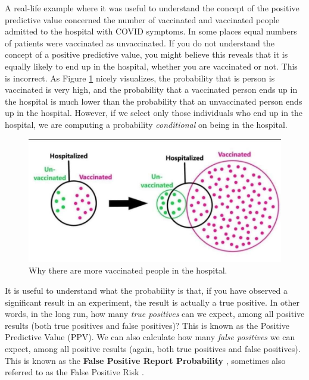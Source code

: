 \documentclass[
  oneside]{book}
\begin{document}
A real-life example where it was useful to understand the concept of the positive predictive value concerned the number of vaccinated and vaccinated people admitted to the hospital with COVID symptoms. In some places equal numbers of patients were vaccinated as unvaccinated. If you do not understand the concept of a positive predictive value, you might believe this reveals that it is equally likely to end up in the hospital, whether you are vaccinated or not. This is incorrect. As Figure \ref{fig:ppvhospital} nicely visualizes, the probability that is person is vaccinated is very high, and the probability that a vaccinated person ends up in the hospital is much lower than the probability that an unvaccinated person ends up in the hospital. However, if we select only those individuals who end up in the hospital, we are computing a probability \emph{conditional} on being in the hospital.

\begin{figure}

{\centering \includegraphics[width=1\linewidth]{images/hospitalvaccinated} 

}

\caption{Why there are more vaccinated people in the hospital.}\label{fig:ppvhospital}
\end{figure}

It is useful to understand what the probability is that, if you have observed a significant result in an experiment, the result is actually a true positive. In other words, in the long run, how many \emph{true positives} can we expect, among all positive results (both true positives and false positives)? This is known as the Positive Predictive Value (PPV). We can also calculate how many \emph{false positives} we can expect, among all positive results (again, both true positives and false positives). This is known as the \textbf{False Positive Report Probability} \citep{wacholder_assessing_2004}, sometimes also referred to as the False Positive Risk \citep{colquhoun_false_2019}.
\end{document}
